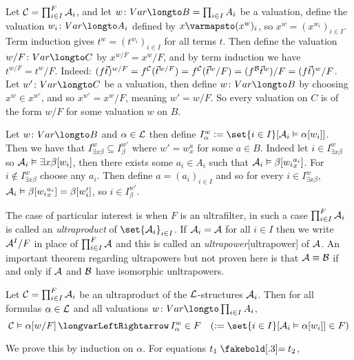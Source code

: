 Let ${\cal C}=\prod_{i\in I}^F{\cal A}_i$, and let $w\colon\Var\longto B=\prod_{i\in I}A_i$ be a valuation, define the valuation $w_i\colon\Var\longto A_i$ defined by $x\varmapsto(x^w)_i$, so
$x^w=(x^{w_i})_{i\in I}$.
Term induction gives $t^w=(t^{w_i})_{i\in I}$ for all terms $t$.
Then define the valuation $w/F\colon\Var\longto C$ by $x^{w/F}=x^w/F$, and by term induction we have $t^{w/F}=t^w/F$.
Indeed: $(f\vec t)^{w/F}=f^{\cal C}(\vec t^{w/F})=f^{\cal C}(\vec t^w/F)=(f^{\cal B}\vec t^w)/F=(f\vec t)^w/F$.
Let $w'\colon\Var\longto C$ be a valuation, then define $w\colon\Var\longto B$ by choosing $x^w\in x^{w'}$, and so $x^{w'}=x^w/F$, meaning $w'=w/F$.
So every valuation on $C$ is of the form $w/F$ for some valuation $w$ on $B$.

Let $w\colon\Var\longto B$ and $\alpha\in{\cal L}$ then define $I^w_\alpha\coloneqq\set{i\in I}[{\cal A}_i\vDash\alpha{[w_i]}]$.
Then we have that $I^w_{\exists x\beta}\subseteq I^{w'}_\beta$ where $w'=w^a_x$ for some $a\in B$.
Indeed let $i\in I^w_{\exists x\beta}$ so ${\cal A}_i\vDash\exists x\beta[w_i]$, then there exists some $a_i\in A_i$ such that ${\cal A}_i\vDash\beta[w_i{}^{a_i}_x]$.
For $i\notin I^w_{\exists x\beta}$ choose any $a_i$.
Then define $a=(a_i)_{i\in I}$ and so for every $i\in I^w_{\exists x\beta}$, ${\cal A}_i\vDash\beta[w_i{}^{a_i}_x]=\beta[w'_i]$, so $i\in I^{w'}_\beta$.

The case of particular interest is when $F$ is an ultrafilter, in such a case $\prod_{i\in I}^F{\cal A}_i$ is called an {\it ultraproduct} of $\set{{\cal A}_i}_{i\in I}$.
If ${\cal A}_i={\cal A}$ for all $i\in I$ then we write ${\cal A}^I/F$ in place of $\prod_{i\in I}^F{\cal A}$ and this is called an {\it ultrapower}[ultrapower] of ${\cal A}$.
An important theorem regarding ultrapowers but not proven here is that ${\cal A}\equiv{\cal B}$ if and only if ${\cal A}$ and ${\cal B}$ have isomorphic unltrapowers.

\bthrm[title=\L o\'s's Ultraproduct Theorem, name=losultraproducttheorem]

    Let ${\cal C}=\prod_{i\in I}^F{\cal A}_i$ be an ultraproduct of the ${\cal L}$-structures ${\cal A}_i$.
    Then for all formulas $\alpha\in{\cal L}$ and all valuations $w\colon\Var\longto\prod_{i\in I}A_i$,
    $$ {\cal C}\vDash\alpha[w/F] \iff I^w_\alpha\in F \quad (\coloneqq\set{i\in I}[{\cal A}_i\vDash\alpha{[w_i]}]\in F) $$

\ethrm

We prove this by induction on $\alpha$.
For equations $t_1\eq t_2$,

